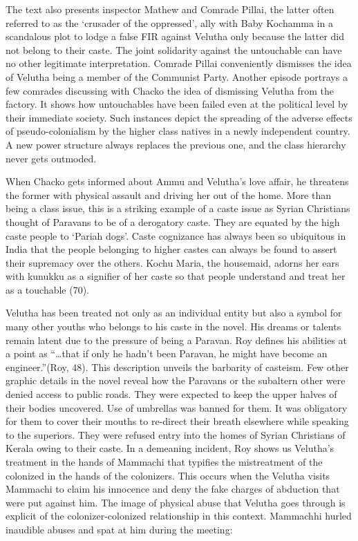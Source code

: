 The text also presents inspector Mathew and Comrade Pillai, the latter often referred to as the ‘crusader of the oppressed’, ally with Baby Kochamma in a scandalous plot to lodge a false FIR against Velutha only because the latter did not belong to their caste. The joint solidarity against the untouchable can have no other legitimate interpretation. Comrade Pillai conveniently dismisses the idea of Velutha being a member of the Communist Party. Another episode portrays a few comrades discussing with Chacko the idea of dismissing Velutha from the factory. It shows how untouchables have been failed even at the political level by their immediate society. Such instances depict the spreading of the adverse effects of pseudo-colonialism by the higher class natives in a newly independent country. A new power structure always replaces the previous one, and the class hierarchy never gets outmoded.

When Chacko gets informed about Ammu and Velutha’s love affair, he threatens the former with physical assault and driving her out of the home. More than being a class issue, this is a striking example of a caste issue as Syrian Christians thought of Paravans to be of a derogatory caste. They are equated by the high caste people to ‘Pariah dogs’. Caste cognizance has always been so ubiquitous in India that the people belonging to higher castes can always be found to assert their supremacy over the others. Kochu Maria, the housemaid, adorns her ears with kunukku as a signifier of her caste so that people understand and treat her as a touchable (70).

Velutha has been treated not only as an individual entity but also a symbol for many other youths who belongs to his caste in the novel. His dreams or talents remain latent due to the pressure of being a Paravan. Roy defines his abilities at a point as  “…that if only he hadn’t been Paravan, he might have become an engineer.”(Roy, 48). This description unveils the barbarity of casteism. Few other graphic details in the novel reveal how the Paravans or the subaltern other were denied access to public roads. They were expected to keep the upper halves of their bodies uncovered. Use of umbrellas was banned for them. It was obligatory for them to cover their mouths to re-direct their breath elsewhere while speaking to the superiors. They were refused entry into the homes of Syrian Christians of Kerala owing to their caste. In a demeaning incident, Roy shows us Velutha’s treatment in the hands of Mammachi that typifies the mistreatment of the colonized in the hands of the colonizers. This occurs when the Velutha visits Mammachi to claim his innocence and deny the fake charges of abduction that were put against him. The image of physical abuse that Velutha goes through is explicit of the colonizer-colonized relationship in this context. Mammachhi hurled inaudible abuses and spat at him during the meeting:

